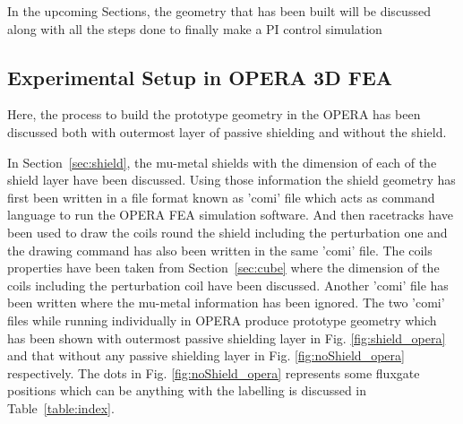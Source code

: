 In the upcoming Sections, the geometry that has been built will be discussed along with all the steps done to finally make a PI control simulation


\subsection{Experimental Setup in OPERA 3D FEA}

Here, the process to build the prototype geometry in the OPERA has been discussed both with outermost layer of passive shielding and without the shield.

In Section~\ref{sec:shield}, the mu-metal shields with the dimension of each of the shield layer have been discussed. Using those information the shield geometry has first been written in a file format known as 'comi' file which acts as command language to run the OPERA FEA simulation software. And then racetracks have been used to draw the coils round the shield including the perturbation one and the drawing command has also been written in the same 'comi' file. The coils properties have been taken from Section~\ref{sec:cube} where the dimension of the coils including the perturbation coil have been discussed. Another 'comi' file has been written where the mu-metal information has been ignored. The two 'comi' files while running individually in OPERA produce prototype geometry which has been shown with outermost passive shielding layer in Fig. \ref{fig:shield_opera} and that without any passive shielding layer in Fig. \ref{fig:noShield_opera} respectively. The dots in Fig. \ref{fig:noShield_opera} represents some fluxgate positions which can be anything with the labelling is discussed in Table~\ref{table:index}.


\FloatBarrier

